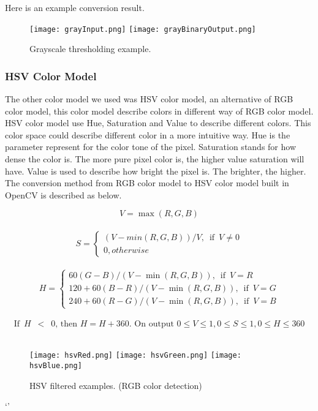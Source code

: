             Here is an example conversion result.
            \begin{figure}
                \texttt{[image: grayInput.png]}
                \texttt{[image: grayBinaryOutput.png]}
                \caption{Grayscale thresholding example.}
                \label{fig:thresholding_Example}
            \end{figure}


        \subsubsection{HSV Color Model}
            The other color model we used was HSV color model, an alternative of RGB color model, this color model describe colors in different way of RGB color model.
            HSV color model use Hue, Saturation and Value to describe different colors.
            This color space could describe different color in a more intuitive way.
            Hue is the parameter represent for the color tone of the pixel. %
            Saturation stands for how dense the color is. The more pure pixel color is, the higher value saturation will have.
            Value is used to describe how bright the pixel is. The brighter, the higher.
            The conversion method from RGB color model to HSV color model built in OpenCV is described as below.

            $$
                V = \max(R,G,B)
            $$\\
            $$
                S = 
                \begin{cases}   
                    {{{(V-min(R,G,B))}/{V}}, \enspace\textrm{if}\enspace V \neq 0}\\
                    {0, otherwise}
                \end{cases}
            $$\\
            $$
                H =
                \begin{cases} 
                    {{60(G - B)}/{(V-\min(R,G,B))}, \enspace\textrm{if}\enspace V=R}\\
                    {{120+60(B - R)}/{(V-\min(R,G,B))}, \enspace\textrm{if}\enspace V=G}\\
                    {{240+60(R - G)}/{(V-\min(R,G,B))}, \enspace\textrm{if}\enspace V=B}
                \end{cases}
            $$\\
            $$
                \textrm{If} \enspace H \enspace < \enspace 0 \textrm{, then } H = H + 360. \textrm{ On output } 0 \leq V \leq 1, 0 \leq S \leq 1, 0 \leq H \leq 360
            $$\\
            \begin{figure}
                \texttt{[image: hsvRed.png]}
                \texttt{[image: hsvGreen.png]}
                \texttt{[image: hsvBlue.png]}
                \caption{HSV filtered examples. (RGB color detection)}
                \label{fig:HSV_Example}
            \end{figure}
`'
